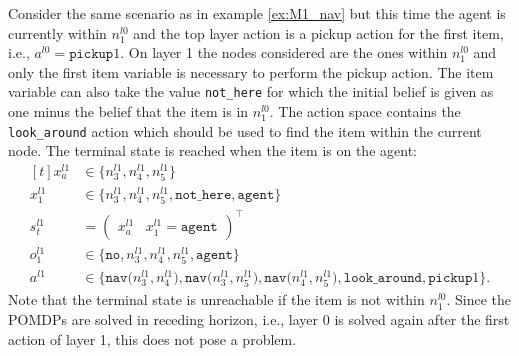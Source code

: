 \begin{example}
Consider the same scenario as in example \ref{ex:M1_nav} but this time the agent is currently within $n_1^{l0}$ and the top layer action is a pickup action for the first item, i.e., $a^{l0}=\texttt{pickup}1$. On layer 1 the nodes considered are the ones within $n_1^{l0}$ and only the first item variable is necessary to perform the pickup action. The item variable can also take the value \texttt{not\_here} for which the initial belief is given as one minus the belief that the item is in $n_1^{l0}$. The action space contains the \texttt{look\_around} action which should be used to find the item within the current node. The terminal state is reached when the item is on the agent:
\begin{equation}
    \begin{aligned}[t] 
        x_a^{l1} &\in \big\{ n_3^{l1}, n_4^{l1}, n_5^{l1} \big\} \\
        x_1^{l1} &\in  \big\{ n_3^{l1}, n_4^{l1}, n_5^{l1}, \texttt{not\_here}, \texttt{agent} \big\}\\
         s_t^{l1} &= \begin{pmatrix} x_a^{l1} & x_1^{l1}=\texttt{agent} \end{pmatrix}^\intercal\\
        o_1^{l1} &\in \big\{\texttt{no},n_3^{l1}, n_4^{l1}, n_5^{l1}, \texttt{agent} \big\}\\
        a^{l1} &\in \big\{\texttt{nav($n_3^{l1}, n_4^{l1}$)}, \texttt{nav($n_3^{l1}, n_5^{l1}$)}, \texttt{nav($n_4^{l1}, n_5^{l1}$)}, \texttt{look\_around}, \texttt{pickup}1 \big\}.
        \end{aligned}
\end{equation}
 Note that the terminal state is unreachable if the item is not within $n_1^{l0}$. Since the POMDPs are solved in receding horizon, i.e., layer 0 is solved again after the first action of layer 1, this does not pose a problem.
 \demo
\end{example}

